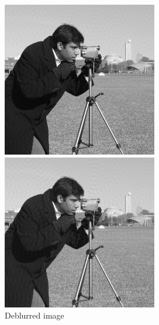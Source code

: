 \documentclass[../main]{subfiles}
\begin{document}
\begin{figure}[htpb]
    \centering
    \begin{minipage}[b]{.49\hsize}
        \centering
        \includegraphics[width=\linewidth]{figs/cameraman_deblurred_2.png}
    \end{minipage}
    \begin{minipage}[b]{.49\hsize}
        \centering
        \includegraphics[width=\linewidth]{figs/cameraman_deblurred_11.png}
    \end{minipage}
    \caption{Deblurred image}
    \label{fig:deblurred}
\end{figure}
\end{document}
